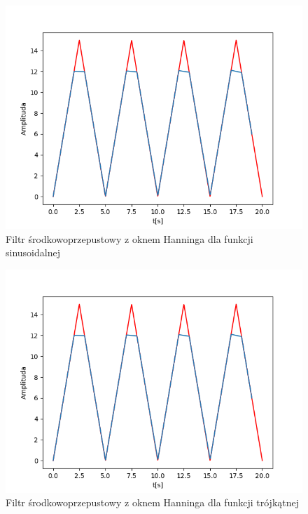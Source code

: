 \documentclass[12pt]{article}
\begin{document}
\begin{figure}[H]
\centering
\includegraphics[scale=0.6]{8trojkatInterp1rzedu20.png}
\caption{Filtr środkowoprzepustowy z oknem Hanninga dla funkcji sinusoidalnej}
\end{figure}

\begin{figure}[H]
\centering
\includegraphics[scale=0.6]{8trojkatInterp1rzedu20.png}
\caption{Filtr środkowoprzepustowy z oknem Hanninga dla funkcji trójkątnej}
\end{figure}
\end{document}
